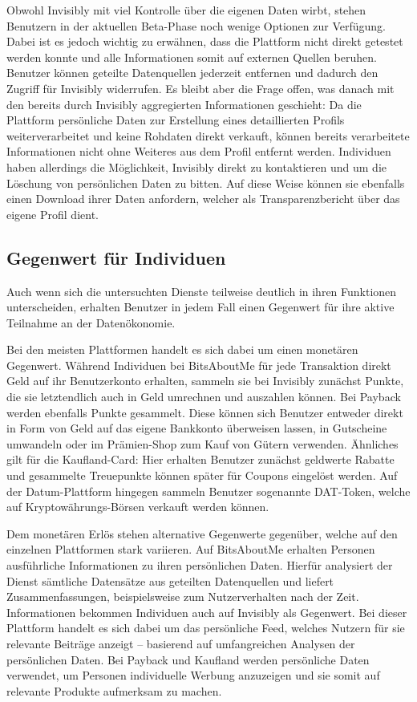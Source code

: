 \noindent Obwohl Invisibly mit viel Kontrolle über die eigenen Daten wirbt, stehen Benutzern in der aktuellen Beta-Phase noch wenige Optionen zur Verfügung. Dabei ist es jedoch wichtig zu erwähnen, dass die Plattform nicht direkt getestet werden konnte und alle Informationen somit auf externen Quellen beruhen. Benutzer können geteilte Datenquellen jederzeit entfernen und dadurch den Zugriff für Invisibly widerrufen. Es bleibt aber die Frage offen, was danach mit den bereits durch Invisibly aggregierten Informationen geschieht: Da die Plattform persönliche Daten zur Erstellung eines detaillierten Profils weiterverarbeitet und keine Rohdaten direkt verkauft, können bereits verarbeitete Informationen nicht ohne Weiteres aus dem Profil entfernt werden. Individuen haben allerdings die Möglichkeit, Invisibly direkt zu kontaktieren und um die Löschung von persönlichen Daten zu bitten. Auf diese Weise können sie ebenfalls einen Download ihrer Daten anfordern, welcher als Transparenzbericht über das eigene Profil dient.

\subsection{Gegenwert für Individuen}
Auch wenn sich die untersuchten Dienste teilweise deutlich in ihren Funktionen unterscheiden, erhalten Benutzer in jedem Fall einen Gegenwert für ihre aktive Teilnahme an der Datenökonomie. \newline

\noindent Bei den meisten Plattformen handelt es sich dabei um einen monetären Gegenwert. Während Individuen bei BitsAboutMe für jede Transaktion direkt Geld auf ihr Benutzerkonto erhalten, sammeln sie bei Invisibly zunächst Punkte, die sie letztendlich auch in Geld umrechnen und auszahlen können. Bei Payback werden ebenfalls Punkte gesammelt. Diese können sich Benutzer entweder direkt in Form von Geld auf das eigene Bankkonto überweisen lassen, in Gutscheine umwandeln oder im Prämien-Shop zum Kauf von Gütern verwenden. Ähnliches gilt für die Kaufland-Card: Hier erhalten Benutzer zunächst geldwerte Rabatte und gesammelte Treuepunkte können später für Coupons eingelöst werden. Auf der Datum-Plattform hingegen sammeln Benutzer sogenannte DAT-Token, welche auf Kryptowährungs-Börsen verkauft werden können.\newline

\noindent Dem monetären Erlös stehen alternative Gegenwerte gegenüber, welche auf den einzelnen Plattformen stark variieren. Auf BitsAboutMe erhalten Personen ausführliche Informationen zu ihren persönlichen Daten. Hierfür analysiert der Dienst sämtliche Datensätze aus geteilten Datenquellen und liefert Zusammenfassungen, beispielsweise zum Nutzerverhalten nach der Zeit. Informationen bekommen Individuen auch auf Invisibly als Gegenwert. Bei dieser Plattform handelt es sich dabei um das persönliche Feed, welches Nutzern für sie relevante Beiträge anzeigt -- basierend auf umfangreichen Analysen der persönlichen Daten. Bei Payback und Kaufland werden persönliche Daten verwendet, um Personen individuelle Werbung anzuzeigen und sie somit auf relevante Produkte aufmerksam zu machen.